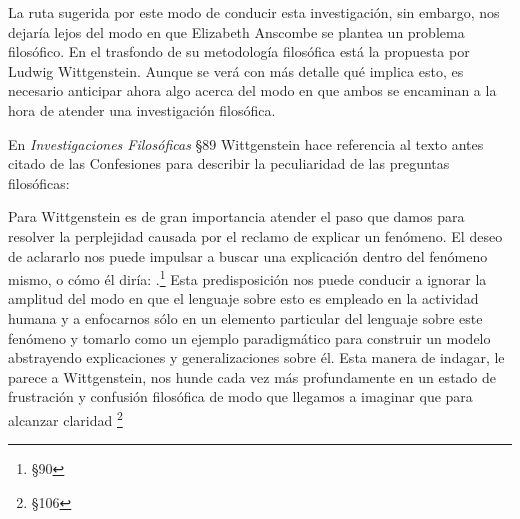   La ruta sugerida por este modo de conducir esta investigación, sin embargo, nos
  dejaría lejos del modo en que Elizabeth Anscombe se plantea un problema
  filosófico. En el trasfondo de su metodología filosófica está la propuesta por
  Ludwig Wittgenstein. Aunque se verá con más detalle qué implica esto, es
  necesario anticipar ahora algo acerca del modo en que ambos se encaminan a la
  hora de atender una investigación filosófica.

  En \emph{Investigaciones Filosóficas} \S89 Wittgenstein hace referencia al
  texto antes citado de las Confesiones para describir la peculiaridad de las
  preguntas filosóficas:

  Para Wittgenstein es de gran importancia atender el paso que damos para
  resolver la perplejidad causada por el reclamo de explicar un fenómeno. El
  deseo de aclararlo nos puede impulsar a buscar una explicación dentro del
  fenómeno mismo, o cómo él diría: .\footnote{\S90} Esta predisposición nos puede conducir
  a ignorar la amplitud del modo en que el lenguaje sobre esto es empleado en la
  actividad humana y a enfocarnos sólo en un elemento particular del lenguaje
  sobre este fenómeno y tomarlo como un ejemplo paradigmático para construir un
  modelo abstrayendo explicaciones y generalizaciones sobre él. Esta manera de
  indagar, le parece a Wittgenstein, nos hunde cada vez más profundamente en un
  estado de frustración y confusión filosófica de modo que llegamos a imaginar
  que para alcanzar claridad \footnote{\S106}


